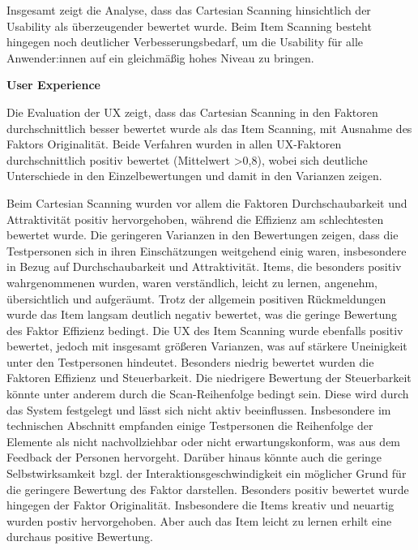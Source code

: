 Insgesamt zeigt die Analyse, dass das Cartesian Scanning hinsichtlich der Usability als überzeugender bewertet wurde. Beim Item Scanning besteht hingegen noch deutlicher Verbesserungsbedarf, um die Usability für alle Anwender:innen auf ein gleichmäßig hohes Niveau zu bringen.

\textbf{User Experience}

Die Evaluation der UX zeigt, dass das Cartesian Scanning in den Faktoren durchschnittlich besser bewertet wurde als das Item Scanning, mit Ausnahme des Faktors Originalität. Beide Verfahren wurden in allen UX-Faktoren durchschnittlich positiv bewertet (Mittelwert >0,8), wobei sich deutliche Unterschiede in den Einzelbewertungen und damit in den Varianzen zeigen.

Beim Cartesian Scanning wurden vor allem die Faktoren Durchschaubarkeit und Attraktivität positiv hervorgehoben, während die Effizienz am schlechtesten bewertet wurde. Die geringeren Varianzen in den Bewertungen zeigen, dass die Testpersonen sich in ihren Einschätzungen weitgehend einig waren, insbesondere in Bezug auf Durchschaubarkeit und Attraktivität. Items, die besonders positiv wahrgenommenen wurden, waren verständlich, leicht zu lernen, angenehm, übersichtlich und aufgeräumt. Trotz der allgemein positiven Rückmeldungen wurde das Item langsam deutlich negativ bewertet, was die geringe Bewertung des Faktor Effizienz bedingt.
Die UX des Item Scanning wurde ebenfalls positiv bewertet, jedoch mit insgesamt größeren Varianzen, was auf stärkere Uneinigkeit unter den Testpersonen hindeutet. Besonders niedrig bewertet wurden die Faktoren Effizienz und Steuerbarkeit. Die niedrigere Bewertung der Steuerbarkeit könnte unter anderem durch die Scan-Reihenfolge bedingt sein. Diese wird durch das System festgelegt und lässt sich nicht aktiv beeinflussen. Insbesondere im technischen Abschnitt empfanden einige Testpersonen die Reihenfolge der Elemente als nicht nachvollziehbar oder nicht erwartungskonform, was aus dem Feedback der Personen hervorgeht. Darüber hinaus könnte auch die geringe Selbstwirksamkeit bzgl. der Interaktionsgeschwindigkeit ein möglicher Grund für die geringere Bewertung des Faktor darstellen. 
Besonders positiv bewertet wurde hingegen der Faktor Originalität. Insbesondere die Items kreativ und neuartig wurden postiv hervorgehoben. Aber auch das Item leicht zu lernen erhilt eine durchaus positive Bewertung. 

